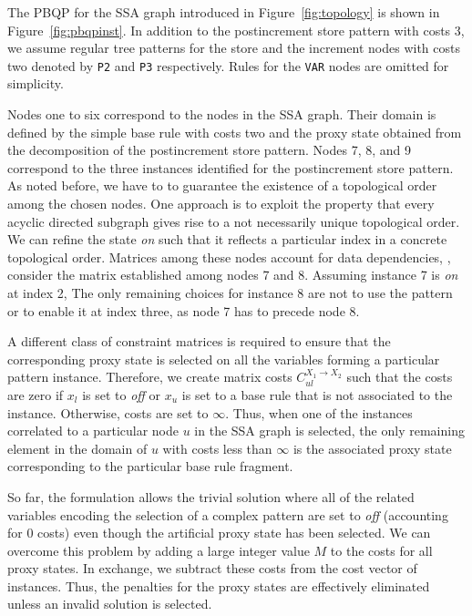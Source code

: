 The PBQP for the SSA graph introduced in Figure~\ref{fig:topology} is
shown in Figure~\ref{fig:pbqpinst}. In addition to the postincrement
store pattern with costs 3, we assume regular tree patterns for the
store and the increment nodes with costs two denoted by \texttt{P2}
and \texttt{P3} respectively. Rules for the \texttt{VAR} nodes are
omitted for simplicity.

Nodes one to six correspond to the nodes in the SSA graph. Their
domain is defined by the simple base rule with costs two and the proxy
state obtained from the decomposition of the postincrement store
pattern. Nodes 7, 8, and 9 correspond to the three instances
identified for the postincrement store pattern. As noted before, we
have to to guarantee the existence of a topological order among the
chosen nodes.  One approach is to exploit the property that every
acyclic directed subgraph gives rise to a not necessarily unique
topological order.  We can refine the state \textit{on} such that it
reflects a particular index in a concrete topological order. Matrices
among these nodes account for data dependencies, \eg, consider the
matrix established among nodes 7 and 8. Assuming instance 7 is
\textit{on} at index 2, The only remaining choices for instance 8 are
not to use the pattern or to enable it at index three, as node 7 has
to precede node 8.

A different class of constraint matrices is required to ensure that
the corresponding proxy state is selected on all the variables forming
a particular pattern instance. Therefore, we create matrix costs
$C^{X_1 \rightarrow X_2}_{ul}$ such that the costs are zero if $x_l$
is set to \textit{off\/} or $x_u$ is set to a base rule that is not
associated to the instance. Otherwise, costs are set to $\infty$.
Thus, when one of the instances correlated to a particular node $u$ in
the SSA graph is selected, the only remaining element in the domain of
$u$ with costs less than $\infty$ is the associated proxy state
corresponding to the particular base rule fragment.

So far, the formulation allows the trivial solution where all of the
related variables encoding the selection of a complex pattern are set
to \textit{off} (accounting for 0 costs) even though the artificial
proxy state has been selected. We can overcome this problem by adding
a large integer value $M$ to the costs for all proxy states. In
exchange, we subtract these costs from the cost vector of
instances. Thus, the penalties for the proxy states are effectively
eliminated unless an invalid solution is selected.

